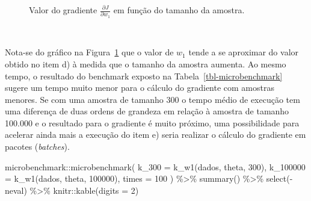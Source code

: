 \documentclass[
  a4paperpaper,
]{article}
\newenvironment{Shaded}{\begin{snugshade}}{\end{snugshade}}
\newcommand{\AttributeTok}[1]{\textcolor[rgb]{0.40,0.45,0.13}{#1}}
\newcommand{\DecValTok}[1]{\textcolor[rgb]{0.68,0.00,0.00}{#1}}
\newcommand{\FunctionTok}[1]{\textcolor[rgb]{0.28,0.35,0.67}{#1}}
\newcommand{\NormalTok}[1]{\textcolor[rgb]{0.00,0.23,0.31}{#1}}
\newcommand{\SpecialCharTok}[1]{\textcolor[rgb]{0.37,0.37,0.37}{#1}}
\begin{document}
\begin{figure}[H]


\caption{\label{fig-gradientek}Valor do gradiente
\(\frac{\partial J}{\partial w_1}\) em função do tamanho da amostra.}

\end{figure}%

~

Nota-se do gráfico na Figura~\ref{fig-gradientek} que o valor de \(w_1\)
tende a se aproximar do valor obtido no item d) à medida que o tamanho
da amostra aumenta. Ao mesmo tempo, o resultado do benchmark exposto na
Tabela~\ref{tbl-microbenchmark} sugere um tempo muito menor para o
cálculo do gradiente com amostras menores. Se com uma amostra de tamanho
300 o tempo médio de execução tem uma diferença de duas ordens de
grandeza em relação à amostra de tamanho 100.000 e o resultado para o
gradiente é muito próximo, uma possibilidade para acelerar ainda mais a
execução do item e) seria realizar o cálculo do gradiente em pacotes
(\emph{batches}).

\begin{Shaded}
\begin{Highlighting}[]
\NormalTok{microbenchmark}\SpecialCharTok{::}\FunctionTok{microbenchmark}\NormalTok{(}
  \AttributeTok{k\_300 =} \FunctionTok{k\_w1}\NormalTok{(dados, theta, }\DecValTok{300}\NormalTok{),}
  \AttributeTok{k\_100000 =} \FunctionTok{k\_w1}\NormalTok{(dados, theta, }\DecValTok{100000}\NormalTok{),}
  \AttributeTok{times =} \DecValTok{100}
\NormalTok{) }\SpecialCharTok{\%\textgreater{}\%}
  \FunctionTok{summary}\NormalTok{() }\SpecialCharTok{\%\textgreater{}\%}
  \FunctionTok{select}\NormalTok{(}\SpecialCharTok{{-}}\NormalTok{neval) }\SpecialCharTok{\%\textgreater{}\%}
\NormalTok{  knitr}\SpecialCharTok{::}\FunctionTok{kable}\NormalTok{(}\AttributeTok{digits =} \DecValTok{2}\NormalTok{)}
\end{Highlighting}
\end{Shaded}
\end{document}
